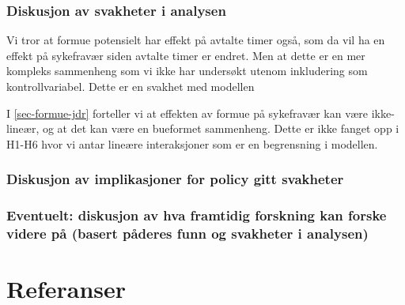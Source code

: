 \documentclass[
  12pt,
  a4paper,
  DIV=11,
  numbers=noendperiod]{scrartcl}
\begin{document}
\subsubsection{Diskusjon av svakheter i
analysen}\label{diskusjon-av-svakheter-i-analysen}

Vi tror at formue potensielt har effekt på avtalte timer også, som da
vil ha en effekt på sykefravær siden avtalte timer er endret. Men at
dette er en mer kompleks sammenheng som vi ikke har undersøkt utenom
inkludering som kontrollvariabel. Dette er en svakhet med modellen

I \autoref{sec-formue-jdr} forteller vi at effekten av formue på
sykefravær kan være ikke-lineær, og at det kan være en bueformet
sammenheng. Dette er ikke fanget opp i H1-H6 hvor vi antar lineære
interaksjoner som er en begrensning i modellen.

\subsubsection{Diskusjon av implikasjoner for policy gitt
svakheter}\label{diskusjon-av-implikasjoner-for-policy-gitt-svakheter}

\subsubsection{Eventuelt: diskusjon av hva framtidig forskning kan
forske videre på (basert påderes funn og svakheter i
analysen)}\label{eventuelt-diskusjon-av-hva-framtidig-forskning-kan-forske-videre-puxe5-basert-puxe5deres-funn-og-svakheter-i-analysen}

\newpage

\section*{Referanser}\label{referanser}
\end{document}
